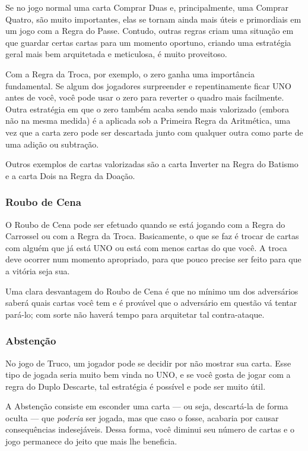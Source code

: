 Se no jogo normal uma carta Comprar Duas e, principalmente, uma Comprar Quatro, são muito importantes, elas se tornam ainda mais úteis e primordiais em um jogo com a Regra do Passe. Contudo, outras regras criam uma situação em que guardar certas cartas para um momento oportuno, criando uma estratégia geral mais bem arquitetada e meticulosa, é muito proveitoso.

Com a Regra da Troca, por exemplo, o zero ganha uma importância fundamental. Se algum dos jogadores surpreender e repentinamente ficar UNO antes de você, você pode usar o zero para reverter o quadro mais facilmente. Outra estratégia em que o zero também acaba sendo mais valorizado (embora não na mesma medida) é a aplicada sob a Primeira Regra da Aritmética, uma vez que a carta zero pode ser descartada junto com qualquer outra como parte de uma adição ou subtração.

Outros exemplos de cartas valorizadas são a carta Inverter na Regra do Batismo e a carta Dois na Regra da Doação.

\subsubsection{Roubo de Cena}

O Roubo de Cena pode ser efetuado quando se está jogando com a Regra do Carrossel ou com a Regra da Troca. Basicamente, o que se faz é trocar de cartas com alguém que já está UNO ou está com menos cartas do que você. A troca deve ocorrer num momento apropriado, para que pouco precise ser feito para que a vitória seja sua.

Uma clara desvantagem do Roubo de Cena é que no mínimo um dos adversários saberá quais cartas você tem e é provável que o adversário em questão vá tentar pará-lo; com sorte não haverá tempo para arquitetar tal contra-ataque.

\subsubsection{Abstenção}

No jogo de Truco, um jogador pode se decidir por não mostrar sua carta. Esse tipo de jogada seria muito bem vinda no UNO, e se você gosta de jogar com a regra do Duplo Descarte, tal estratégia é possível e pode ser muito útil.

A Abstenção consiste em esconder uma carta --- ou seja, descartá-la de forma oculta --- que \emph{poderia} ser jogada, mas que caso o fosse, acabaria por causar consequências indesejáveis. Dessa forma, você diminui seu número de cartas e o jogo permanece do jeito que mais lhe beneficia.

